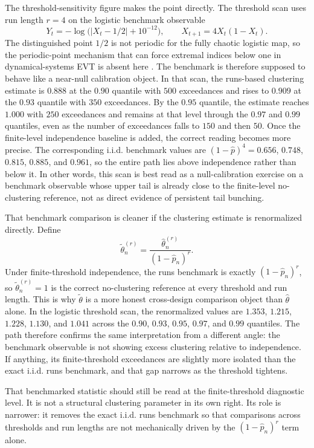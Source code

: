 \documentclass[11pt]{article}
\begin{document}
The threshold-sensitivity figure makes the point directly. The threshold scan uses run length $r=4$ on the logistic benchmark observable
\[
Y_t=-\log\!\bigl(|X_t-1/2|+10^{-12}\bigr),
\qquad
X_{t+1}=4X_t(1-X_t).
\]
The distinguished point $1/2$ is not periodic for the fully chaotic logistic map, so the periodic-point mechanism that can force extremal indices below one in dynamical-systems EVT is absent here \cite{freitas2010}. The benchmark is therefore supposed to behave like a near-null calibration object. In that scan, the runs-based clustering estimate is $0.888$ at the $0.90$ quantile with $500$ exceedances and rises to $0.909$ at the $0.93$ quantile with $350$ exceedances. By the $0.95$ quantile, the estimate reaches $1.000$ with $250$ exceedances and remains at that level through the $0.97$ and $0.99$ quantiles, even as the number of exceedances falls to $150$ and then $50$. Once the finite-level independence baseline is added, the correct reading becomes more precise. The corresponding i.i.d. benchmark values are $(1-\widehat{p})^4=0.656$, $0.748$, $0.815$, $0.885$, and $0.961$, so the entire path lies above independence rather than below it. In other words, this scan is best read as a null-calibration exercise on a benchmark observable whose upper tail is already close to the finite-level no-clustering reference, not as direct evidence of persistent tail bunching.

That benchmark comparison is cleaner if the clustering estimate is renormalized directly. Define
\[
\widetilde{\theta}_n^{(r)}=\frac{\widehat{\theta}_n^{(r)}}{(1-\widehat{p}_n)^r}.
\]
Under finite-threshold independence, the runs benchmark is exactly $(1-\widehat{p}_n)^r$, so $\widetilde{\theta}_n^{(r)}=1$ is the correct no-clustering reference at every threshold and run length. This is why $\widetilde{\theta}$ is a more honest cross-design comparison object than $\widehat{\theta}$ alone. In the logistic threshold scan, the renormalized values are $1.353$, $1.215$, $1.228$, $1.130$, and $1.041$ across the $0.90$, $0.93$, $0.95$, $0.97$, and $0.99$ quantiles. The path therefore confirms the same interpretation from a different angle: the benchmark observable is not showing excess clustering relative to independence. If anything, its finite-threshold exceedances are slightly more isolated than the exact i.i.d. runs benchmark, and that gap narrows as the threshold tightens.

That benchmarked statistic should still be read at the finite-threshold diagnostic level. It is not a structural clustering parameter in its own right. Its role is narrower: it removes the exact i.i.d. runs benchmark so that comparisons across thresholds and run lengths are not mechanically driven by the $(1-\widehat{p}_n)^r$ term alone.
\end{document}
